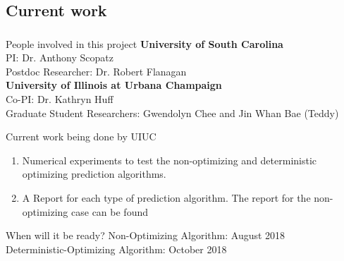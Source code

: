 \subsection{Current work}
\begin{frame}
\frametitle{}

\begin{block}{People involved in this project}
	\textbf{University of South Carolina}\\
	PI: Dr. Anthony Scopatz \\
	Postdoc Researcher: Dr. Robert Flanagan \\
	\textbf{University of Illinois at Urbana Champaign} \\
	Co-PI: Dr. Kathryn Huff \\
	Graduate Student Researchers: Gwendolyn Chee and Jin Whan Bae (Teddy)
\end{block}

\begin{block}{Current work being done by UIUC}
	\begin{enumerate}
		\item Numerical experiments to test the non-optimizing and deterministic optimizing prediction algorithms. 
		\item A Report for each type of prediction algorithm. The report for the non-optimizing case can be found \cite{bae_numerical_2018}
	\end{enumerate}
\end{block}

\begin{block}{When will it be ready? }
	Non-Optimizing Algorithm: August 2018	\\
	Deterministic-Optimizing Algorithm: October 2018	
\end{block}


\end{frame}
